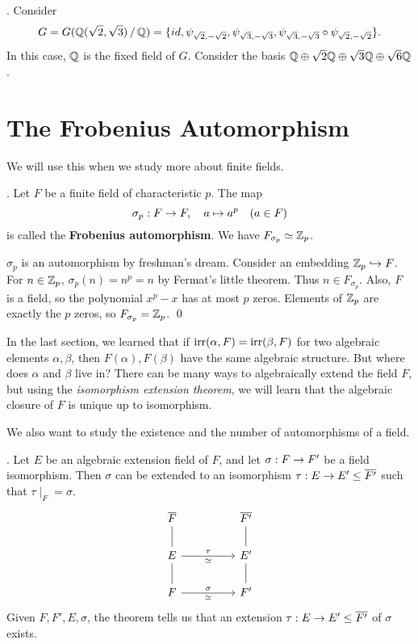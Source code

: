 \ex. Consider
\[
    G = G(\mathbb{Q}(\sqrt{2}, \sqrt{3}) \operatorname{/} \mathbb{Q}) = \{id, \psi_{\sqrt{2}, -\sqrt{2}}, \psi_{\sqrt{3}, -\sqrt{3}}, \psi_{\sqrt{3}, -\sqrt{3}} \circ \psi_{\sqrt{2}, -\sqrt{2}}\}.
\]
In this case, \(\mathbb{Q}\) is the fixed field of \(G\). Consider the basis \(\mathbb{Q} \oplus \sqrt{2} \mathbb{Q} \oplus \sqrt{3} \mathbb{Q} \oplus \sqrt{6}\mathbb{Q}\).

\section*{The Frobenius Automorphism}

We will use this when we study more about finite fields.

\thm.  Let \(F\) be a finite field of characteristic \(p\). The map
\[
    \sigma_p : F \rightarrow F, \quad a \mapsto a^p \quad (a \in F)
\]
is called the \textbf{Frobenius automorphism}. We have \(F_{\sigma_p} \simeq \mathbb{Z}_p\).

\pf \(\sigma_p\) is an automorphism by freshman's dream. Consider an embedding \(\mathbb{Z}_p \hookrightarrow F\). For \(n \in \mathbb{Z}_p\), \(\sigma_p(n) = n^p = n\) by Fermat's little theorem. Thus \(n \in F_{\sigma_p}\). Also, \(F\) is a field, so the polynomial \(x^p - x\) has at most \(p\) zeros. Elements of \(\mathbb{Z}_p\) are exactly the \(p\) zeros, so \(F_{\sigma_p} = \mathbb{Z}_p\). \qed


In the last section, we learned that if \(\mathrm{irr}(\alpha, F) = \mathrm{irr}(\beta, F)\) for two algebraic elements \(\alpha, \beta\), then \(F(\alpha), F(\beta)\) have the same algebraic structure. But where does \(\alpha\) and \(\beta\) live in? There can be many ways to algebraically extend the field \(F\), but using the \textit{isomorphism extension theorem}, we will learn that the algebraic closure of \(F\) is unique up to isomorphism.

We also want to study the existence and the number of automorphisms of a field.

\thm.  Let \(E\) be an algebraic extension field of \(F\), and let \(\sigma : F \rightarrow F'\) be a field isomorphism. Then \(\sigma\) can be extended to an isomorphism \(\tau : E \ra E' \leq \bar{F'}\) such that \(\tau\mid_F = \sigma\).
\[
    \begin{tikzcd}
        \bar{F} \arrow[dash]{d} & &\bar{F'} \arrow[dash]{d} \\
        E \arrow[dash]{d} \arrow{rr}{\tau}[swap]{\simeq} & & E' \arrow[dash]{d} \\
        F \arrow{rr}{\sigma}[swap]{\simeq} & & F'
    \end{tikzcd}
\]
Given \(F, F', E, \sigma\), the theorem tells us that an extension \(\tau : E \ra E' \leq \bar{F'}\) of \(\sigma\) exists.

